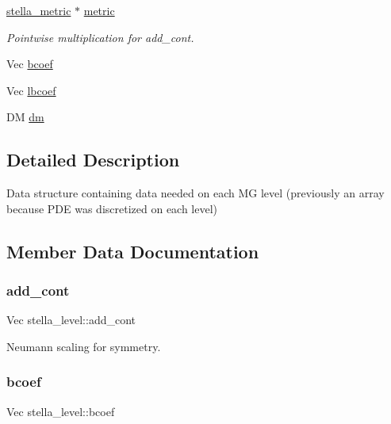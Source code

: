\begin{DoxyCompactItemize}
\mbox{\hyperlink{structstella__metric}{stella\+\_\+metric}} $\ast$ \mbox{\hyperlink{structstella__level_a1f62922769745e8512f979a0ba07cb78}{metric}}
\begin{DoxyCompactList}\small\item\em Pointwise multiplication for add\+\_\+cont. \end{DoxyCompactList}\item 
Vec \mbox{\hyperlink{structstella__level_a99de7f87e37f52459cf6619b5b1cf535}{bcoef}}
\item 
Vec \mbox{\hyperlink{structstella__level_af5e51a3c9dde9e9c983946805455e406}{lbcoef}}
\item 
DM \mbox{\hyperlink{structstella__level_a1b9399c925bd7b0caf73ee0f9482f3bb}{dm}}
\end{DoxyCompactItemize}


\subsection{Detailed Description}
Data structure containing data needed on each MG level (previously an array because P\+DE was discretized on each level) 

\subsection{Member Data Documentation}
\mbox{\label{structstella__level_a13d222e51aeebee890e03a212e5da952}} 
\subsubsection{\texorpdfstring{add\+\_\+cont}{add\_cont}}
{\footnotesize\ttfamily Vec stella\+\_\+level\+::add\+\_\+cont}



Neumann scaling for symmetry. 

\mbox{\label{structstella__level_a99de7f87e37f52459cf6619b5b1cf535}} 
\subsubsection{\texorpdfstring{bcoef}{bcoef}}
{\footnotesize\ttfamily Vec stella\+\_\+level\+::bcoef}

